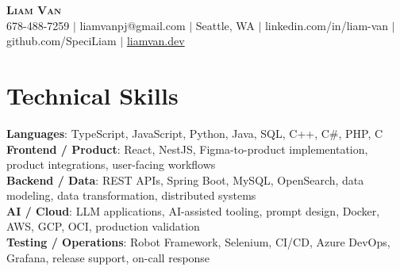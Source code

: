 \documentclass[letterpaper,11pt]{article}
\begin{document}

%
\begin{center}
    \textbf{\Huge \scshape Liam Van} \\ \vspace{1pt}
    \small 678-488-7259 $|$ liamvanpj@gmail.com $|$ Seattle, WA $|$
    linkedin.com/in/liam-van $|$ github.com/SpeciLiam $|$ \href{https://liamvan.dev}{liamvan.dev}

\end{center}

\section{Technical Skills}
 \begin{itemize}[leftmargin=0.15in, label={}]
    \small{\item{
     \textbf{Languages}{: TypeScript, JavaScript, Python, Java, SQL, C++, C\#, PHP, C} \\
     \textbf{Frontend / Product}{: React, NestJS, Figma-to-product implementation, product integrations, user-facing workflows} \\
     \textbf{Backend / Data}{: REST APIs, Spring Boot, MySQL, OpenSearch, data modeling, data transformation, distributed systems} \\
     \textbf{AI / Cloud}{: LLM applications, AI-assisted tooling, prompt design, Docker, AWS, GCP, OCI, production validation} \\
     \textbf{Testing / Operations}{: Robot Framework, Selenium, CI/CD, Azure DevOps, Grafana, release support, on-call response} \\
    }}
 \end{itemize}
%
\end{document}

